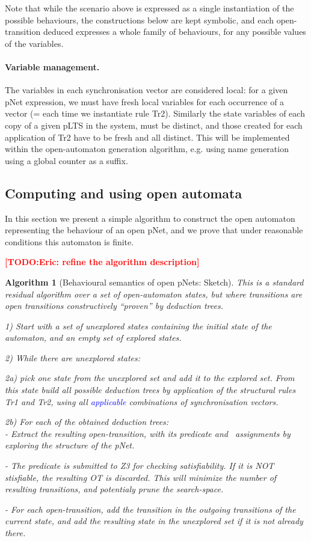 \documentclass{lncs/llncs}
\newcommand{\TODO}[1]{\textcolor{red}{\textbf{[TODO:#1]}}}
\newcommand{\ERIC}[1]{\textcolor{blue}{#1}}
\newtheorem{algorithm}[theorem]{Algorithm}
\begin{document}
Note that while the scenario above is expressed as a single
instantiation of the possible behaviours, the constructions below are
kept symbolic, and each open-transition deduced expresses a whole family of
behaviours, for any possible values of the variables.

\paragraph{Variable management.}
The variables in each synchronisation vector are considered local:
for a given pNet expression, we must have fresh local variables for
each occurrence of a vector (= each time we instantiate rule
Tr2). Similarly the state variables of each copy of a
given pLTS in the system, must be distinct, and those created for each
application of Tr2 have to be fresh and all distinct. 
This will be implemented within the open-automaton generation algorithm,
e.g. using name generation using a global counter as a suffix.



\subsection{Computing and using open automata}
In this section we present a simple algorithm to construct the open
automaton representing the behaviour of an open pNet, and we prove that
under reasonable conditions this automaton is finite.

\TODO{Eric: refine the algorithm description}

\begin{algorithm}[Behavioural semantics of open pNets: Sketch]
This is a standard residual algorithm over a set of open-automaton
states, but where transitions are open transitions
constructively ``proven'' by deduction trees.

1) Start with a set of unexplored states containing the initial state
of the automaton, and an empty set of explored states.

2) While there are unexplored states:

2a) pick one state from the unexplored set and add it to the explored
set. From this state
build all possible deduction trees by application of the structural
rules Tr1 and Tr2, using all \ERIC{applicable} combinations
of synchronisation vectors.

2b) For each of the obtained deduction trees:\\
- Extract the resulting open-transition, with its predicate and
\Post\ assignments by exploring the structure of the pNet.  

- The predicate is submitted to Z3 for checking satisfiability. If it
is NOT stisfiable, the resulting OT is discarded. This will minimize
the number of resulting transitions, and potentialy prune the search-space.

- For each open-transition,  add the transition in the outgoing transitions of
the current state, and add the
resulting state in the unexplored set if it is not already there.

\end{algorithm}
\end{document}
